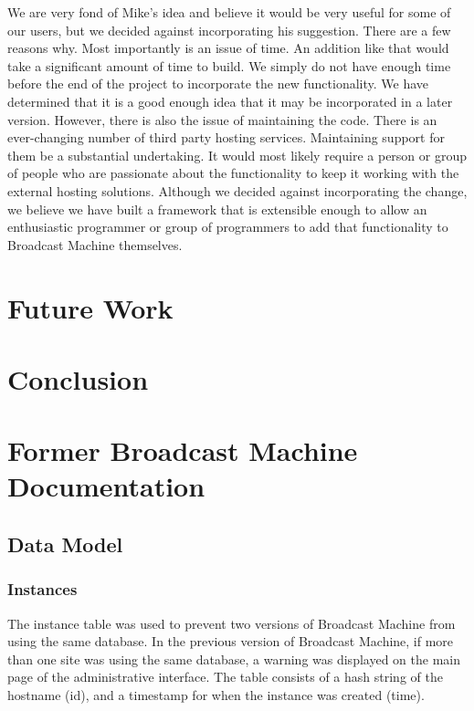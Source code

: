 \documentclass[a4paper,12pt]{report}
\begin{document}
We are very fond of Mike's idea and believe it would be very useful for some of our users, but we decided against 
incorporating his suggestion. 
There are a few reasons why. 
Most importantly is an issue of time. 
An addition like that would take a significant amount of time to build. 
We simply do not have enough time before the end of the project to incorporate the new functionality. 
We have determined that it is a good enough idea that it may be incorporated in a later version. 
However, there is also the issue of maintaining the code. 
There is an ever-changing number of third party hosting services. 
Maintaining support for them be a substantial undertaking. 
It would most likely require a person or group of people who are passionate about the functionality to keep it working 
with the external hosting solutions. 
Although we decided against incorporating the change, we believe we have built a framework that is extensible enough to 
allow an enthusiastic programmer or group of programmers to add that functionality to Broadcast Machine themselves.

\chapter{Future Work}


\chapter{Conclusion}

\appendix
\chapter{Former Broadcast Machine Documentation}

\section{Data Model}


\subsection{Instances}
The instance table was used to prevent two versions of Broadcast Machine from using the same database. In the previous version of Broadcast Machine, if more than one site was using the same database, a warning was displayed on the main page of the administrative interface. The table consists of a hash string of the hostname (id), and a timestamp for when the instance was created (time). 
\end{document}
